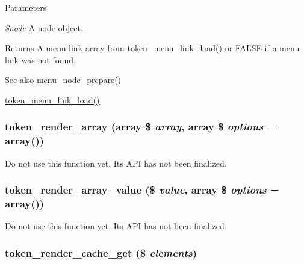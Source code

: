 \begin{DoxyParams}{Parameters}
\item[{\em \$node}]A node object.\end{DoxyParams}
\begin{DoxyReturn}{Returns}
A menu link array from \hyperlink{token_8module_aa10d2e27b2947c29152b40bc0bb3b495}{token\_\-menu\_\-link\_\-load()} or FALSE if a menu link was not found.
\end{DoxyReturn}
\begin{DoxySeeAlso}{See also}
menu\_\-node\_\-prepare() 

\hyperlink{token_8module_aa10d2e27b2947c29152b40bc0bb3b495}{token\_\-menu\_\-link\_\-load()} 
\end{DoxySeeAlso}
\hypertarget{token_8module_a53f85bf43961f4d639af9cee78caee26}{
\subsubsection[{token\_\-render\_\-array}]{\setlength{\rightskip}{0pt plus 5cm}token\_\-render\_\-array (array \$ {\em array}, \/  array \$ {\em options} = {\ttfamily array()})}}
\label{token_8module_a53f85bf43961f4d639af9cee78caee26}
Do not use this function yet. Its API has not been finalized. \hypertarget{token_8module_aa5c8c0b76fdd4786224a066ce1387833}{
\subsubsection[{token\_\-render\_\-array\_\-value}]{\setlength{\rightskip}{0pt plus 5cm}token\_\-render\_\-array\_\-value (\$ {\em value}, \/  array \$ {\em options} = {\ttfamily array()})}}
\label{token_8module_aa5c8c0b76fdd4786224a066ce1387833}
Do not use this function yet. Its API has not been finalized. \hypertarget{token_8module_ade265e3948eec87805cabf40bf0c233d}{
\subsubsection[{token\_\-render\_\-cache\_\-get}]{\setlength{\rightskip}{0pt plus 5cm}token\_\-render\_\-cache\_\-get (\$ {\em elements})}}
